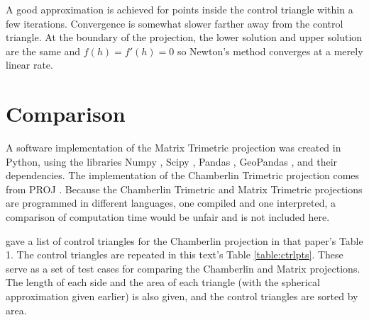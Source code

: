 \documentclass[]{interact}
\begin{document}
A good approximation is achieved for points inside the control triangle within
a few iterations. Convergence is somewhat slower farther away from the
control triangle. At the boundary of the projection,
the lower solution and upper solution are the same and $f(h)=f'(h)=0$
so Newton's method converges at a merely linear rate. \citep{burden}

\section{Comparison}
A software implementation of the Matrix Trimetric projection was created in
Python, using the libraries Numpy \citep{numpy}, Scipy \citep{scipy}, Pandas
\citep{pandas}, GeoPandas \citep{geopandas}, and their dependencies. The
implementation of the Chamberlin Trimetric projection comes from PROJ
\citep{proj}. %
Because the Chamberlin Trimetric and Matrix Trimetric projections are
programmed in different languages, one compiled and one interpreted,
a comparison of computation time would be unfair and is not included here.

\citet{christensen} gave a list of control triangles for the Chamberlin
projection in that paper's Table 1. The control triangles are repeated in this
text's Table \ref{table:ctrlpts}. These serve as a set of test cases for
comparing the Chamberlin and Matrix projections. The length of each side and
the area of each triangle (with the spherical approximation given earlier)
is also given, and the control triangles are sorted by area.
\end{document}

